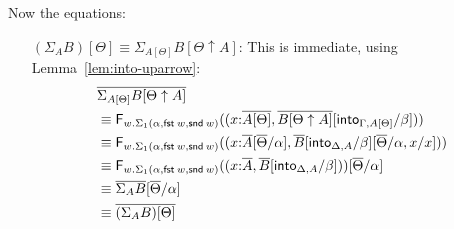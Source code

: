 \documentclass[10pt]{article}
\theoremstyle{definition}
\newcommand\dsd[1]{\ensuremath{\mathsf{#1}}}
\newcommand{\app}[2]{\ensuremath{#1 \: #2}}
\newcommand{\telety}[3]{\ensuremath{(#1{:}#2,#3)}}
\newcommand{\fst}[1]{\app{\dsd{fst}}{#1}}
\newcommand{\snd}[1]{\app{\dsd{snd}}{#1}}
\newcommand\F[2]{\ensuremath{\mathsf{F}_{#1}(#2)}}
\begin{document}
Now the equations:
\begin{enumerate}[style = multiline, labelwidth = 80pt]
\item[{$(\Sigma_A B)[\Theta] \equiv \Sigma_{A[\Theta]} B[\Theta \uparrow A]$}:] This is immediate, using Lemma~\ref{lem:into-uparrow}:
\begin{align*}
&\upstairs{\Sigma_{A[\Theta]} B[\Theta \uparrow A]} \\
&\equiv \F{w. \Sigma_1(\alpha,\fst w, \snd w)}{\telety{x}{\upstairs{A[\Theta]}}{\upstairs{B[\Theta \uparrow A]}[\into{\Gamma, A[\Theta]}/\beta]}} \\
&\equiv \F{w. \Sigma_1(\alpha,\fst w, \snd w)}{\telety{x}{\upstairs{A}[\upstairs{\Theta}/\alpha]}{\upstairs{B}[\into{\Delta, A}/\beta][\upstairs{\Theta}/\alpha, x / x]}} \\
&\equiv \F{w. \Sigma_1(\alpha,\fst w, \snd w)}{\telety{x}{\upstairs{A}}{\upstairs{B}[\into{\Delta, A}/\beta]}}[\upstairs{\Theta}/\alpha] \\
&\equiv \upstairs{\Sigma_A B}[\upstairs{\Theta}/\alpha] \\
&\equiv \upstairs{(\Sigma_A B)[\Theta]}
\end{align*}


\end{enumerate}
\end{document}
